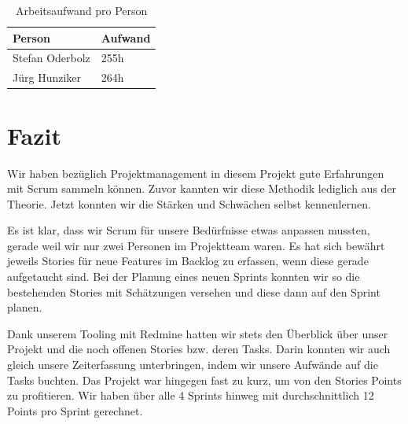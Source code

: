 \begin{table}[H]
\centering
\begin{tabular}{|l|l|}
\hline 
\textbf{Person} & \textbf{Aufwand} \\ 
\hline 
Stefan Oderbolz & 255h \\ 
\hline 
Jürg Hunziker & 264h \\ 
\hline 
\end{tabular}
\caption{Arbeitsaufwand pro Person}
\label{projektmanagement-arbeitsaufwand}
\end{table} 

\section{Fazit}
Wir haben bezüglich Projektmanagement in diesem Projekt gute Erfahrungen mit Scrum sammeln können. Zuvor kannten wir diese Methodik lediglich aus der Theorie. Jetzt konnten wir die Stärken und Schwächen selbst kennenlernen.

Es ist klar, dass wir Scrum für unsere Bedürfnisse etwas anpassen mussten, gerade weil wir nur zwei Personen im Projektteam waren. Es hat sich bewährt jeweils Stories für neue Features im Backlog zu erfassen, wenn diese gerade aufgetaucht sind. Bei der Planung eines neuen Sprints konnten wir so die bestehenden Stories mit Schätzungen versehen und diese dann auf den Sprint planen.

Dank unserem Tooling mit Redmine hatten wir stets den Überblick über unser Projekt und die noch offenen Stories bzw. deren Tasks. Darin konnten wir auch gleich unsere Zeiterfassung unterbringen, indem wir unsere Aufwände auf die Tasks buchten. Das Projekt war hingegen fast zu kurz, um von den Stories Points zu profitieren. Wir haben über alle 4 Sprints hinweg mit durchschnittlich 12 Points pro Sprint gerechnet.
